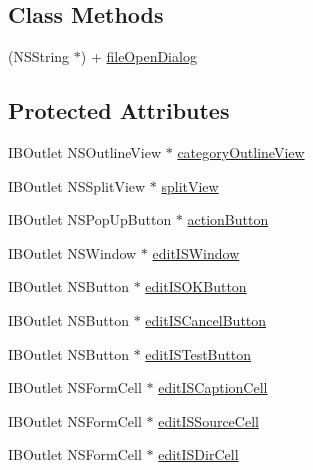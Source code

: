 \subsection*{Class Methods}
\begin{DoxyCompactItemize}
\item 
(N\-S\-String $\ast$) + \hyperlink{interface_module_manage_view_controller_a2030115f055a68b46d4e3a516113fee6}{file\-Open\-Dialog}
\end{DoxyCompactItemize}
\subsection*{Protected Attributes}
\begin{DoxyCompactItemize}
\item 
I\-B\-Outlet N\-S\-Outline\-View $\ast$ \hyperlink{interface_module_manage_view_controller_ac827d075637ca6584f4e9d90379b8272}{category\-Outline\-View}
\item 
I\-B\-Outlet N\-S\-Split\-View $\ast$ \hyperlink{interface_module_manage_view_controller_ab462aed4314ed68bb91230e4fc88c781}{split\-View}
\item 
I\-B\-Outlet N\-S\-Pop\-Up\-Button $\ast$ \hyperlink{interface_module_manage_view_controller_a0a3a028988dd1f16beaaa4b9df60e3c8}{action\-Button}
\item 
I\-B\-Outlet N\-S\-Window $\ast$ \hyperlink{interface_module_manage_view_controller_abb138dad1c1ff6f3d444fd769e3149e5}{edit\-I\-S\-Window}
\item 
I\-B\-Outlet N\-S\-Button $\ast$ \hyperlink{interface_module_manage_view_controller_afe725d27743de2b5f16fa4b9fb2fb4ad}{edit\-I\-S\-O\-K\-Button}
\item 
I\-B\-Outlet N\-S\-Button $\ast$ \hyperlink{interface_module_manage_view_controller_a1a8f69b6ba028f496f14020785b68cad}{edit\-I\-S\-Cancel\-Button}
\item 
I\-B\-Outlet N\-S\-Button $\ast$ \hyperlink{interface_module_manage_view_controller_ab660e85ec704925be3fce81e736c4a0c}{edit\-I\-S\-Test\-Button}
\item 
I\-B\-Outlet N\-S\-Form\-Cell $\ast$ \hyperlink{interface_module_manage_view_controller_a66705c8b871d77327d9b96cf1ba905bc}{edit\-I\-S\-Caption\-Cell}
\item 
I\-B\-Outlet N\-S\-Form\-Cell $\ast$ \hyperlink{interface_module_manage_view_controller_a253f3cca15d92a5fe5c823c6a4b9e889}{edit\-I\-S\-Source\-Cell}
\item 
I\-B\-Outlet N\-S\-Form\-Cell $\ast$ \hyperlink{interface_module_manage_view_controller_a4a3bf19de4d2868f5d1237e353803916}{edit\-I\-S\-Dir\-Cell}

\end{DoxyCompactItemize}
